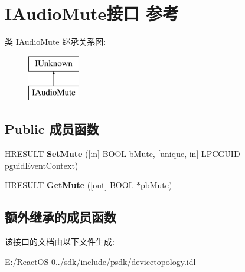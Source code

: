 \hypertarget{interface_i_audio_mute}{}\section{I\+Audio\+Mute接口 参考}
\label{interface_i_audio_mute}
类 I\+Audio\+Mute 继承关系图\+:\begin{figure}[H]
\begin{center}
\leavevmode
\includegraphics[height=2.000000cm]{interface_i_audio_mute}
\end{center}
\end{figure}
\subsection*{Public 成员函数}
\begin{DoxyCompactItemize}
\item 
\mbox{\label{interface_i_audio_mute_a3a3e5e7c49523df3a4470e482abec249}} 
H\+R\+E\+S\+U\+LT {\bfseries Set\+Mute} (\mbox{[}in\mbox{]} B\+O\+OL b\+Mute, \mbox{[}\hyperlink{interfaceunique}{unique}, in\mbox{]} \hyperlink{interface_g_u_i_d}{L\+P\+C\+G\+U\+ID} pguid\+Event\+Context)
\item 
\mbox{\label{interface_i_audio_mute_adb1c4e360327fd911708ace1af10fdcb}} 
H\+R\+E\+S\+U\+LT {\bfseries Get\+Mute} (\mbox{[}out\mbox{]} B\+O\+OL $\ast$pb\+Mute)
\end{DoxyCompactItemize}
\subsection*{额外继承的成员函数}


该接口的文档由以下文件生成\+:\begin{DoxyCompactItemize}
\item 
E\+:/\+React\+O\+S-\/0../sdk/include/psdk/devicetopology.\+idl\end{DoxyCompactItemize}
